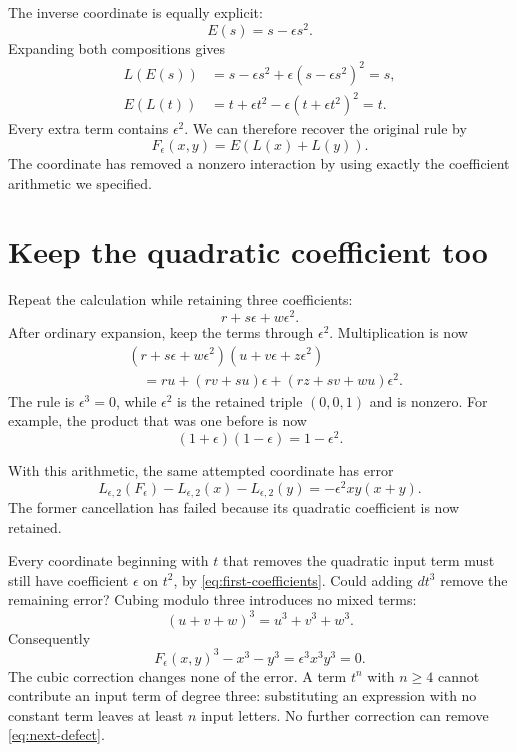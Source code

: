 \documentclass[11pt,letterpaper]{article}
\numberwithin{equation}{section}
\theoremstyle{definition}\newtheorem{example}[theorem]{Example}
\begin{document}
The inverse coordinate is equally explicit:
\[
 E(s)=s-\epsilon s^2.
\]
Expanding both compositions gives
\begin{align*}
 L(E(s))&=s-\epsilon s^2+\epsilon(s-\epsilon s^2)^2=s,\\
 E(L(t))&=t+\epsilon t^2-\epsilon(t+\epsilon t^2)^2=t.
\end{align*}
Every extra term contains \(\epsilon^2\). We can therefore recover the original rule by
\[
 F_\epsilon(x,y)=E(L(x)+L(y)).
\]
The coordinate has removed a nonzero interaction by using exactly the coefficient arithmetic we specified.

\section{Keep the quadratic coefficient too}\label{sec:next-order}

Repeat the calculation while retaining three coefficients:
\[
 r+s\epsilon+w\epsilon^2.
\]
After ordinary expansion, keep the terms through \(\epsilon^2\). Multiplication is now
\begin{equation}\label{eq:three-coefficients}
 \begin{split}
 &(r+s\epsilon+w\epsilon^2)(u+v\epsilon+z\epsilon^2)\\
 &\quad=ru+(rv+su)\epsilon+(rz+sv+wu)\epsilon^2.
 \end{split}
\end{equation}
The rule is \(\epsilon^3=0\), while \(\epsilon^2\) is the retained triple \((0,0,1)\) and is nonzero. For example, the product that was one before is now
\[
 (1+\epsilon)(1-\epsilon)=1-\epsilon^2.
\]

With this arithmetic, the same attempted coordinate has error
\begin{equation}\label{eq:next-defect}
 L_{\epsilon,2}(F_\epsilon)-L_{\epsilon,2}(x)-L_{\epsilon,2}(y)
 =-\epsilon^2xy(x+y).
\end{equation}
The former cancellation has failed because its quadratic coefficient is now retained.

Every coordinate beginning with \(t\) that removes the quadratic input term must still have coefficient \(\epsilon\) on \(t^2\), by \eqref{eq:first-coefficients}. Could adding \(d t^3\) remove the remaining error? Cubing modulo three introduces no mixed terms:
\[
 (u+v+w)^3=u^3+v^3+w^3.
\]
Consequently
\[
 F_\epsilon(x,y)^3-x^3-y^3=\epsilon^3x^3y^3=0.
\]
The cubic correction changes none of the error. A term \(t^n\) with \(n\ge4\) cannot contribute an input term of degree three: substituting an expression with no constant term leaves at least \(n\) input letters. No further correction can remove \eqref{eq:next-defect}.
\end{document}
